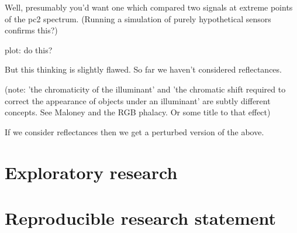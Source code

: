 \documentclass{article}
\begin{document}
Well, presumably you'd want one which compared two signals at extreme points of the pc2 spectrum. (Running a simulation of purely hypothetical sensors confirms this?)

plot: do this? 

But this thinking is slightly flawed. So far we haven't considered reflectances.


(note: 'the chromaticity of the illuminant' and 'the chromatic shift required to correct the appearance of objects under an illuminant' are subtly different concepts. See Maloney and the RGB phalacy. Or some title to that effect)

If we consider reflectances then we get a perturbed version of the above.

\section{Exploratory research}
\section{Reproducible research statement}
\end{document}
